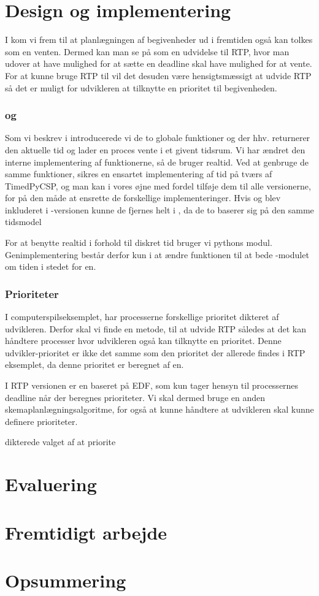 \section{Design og implementering} 
I \des kom vi frem til at planlægningen af begivenheder ud i fremtiden også kan tolkes som en venten. Dermed kan man se på \is som en udvidelse til RTP, hvor man udover at have mulighed for at sætte en deadline skal have mulighed for at vente. For at kunne bruge RTP til \is vil det desuden være hensigtsmæssigt at  udvide RTP så det er muligt for udvikleren at tilknytte en prioritet til begivenheden.

\subsubsection{ og }
Som vi beskrev i \des introducerede vi de to globale funktioner  og  der hhv. returnerer den aktuelle tid og lader en proces vente i et givent tidsrum. Vi har ændret den interne implementering af funktionerne, så de bruger realtid. Ved at genbruge de samme funktioner, sikres en ensartet implementering af tid på tværs af TimedPyCSP, og man kan i vores øjne med fordel tilføje dem til alle \pycsp versionerne, for på den måde at ensrette de forskellige implementeringer. Hvis  og  blev inkluderet i -versionen kunne de fjernes helt i \is, da de to baserer sig på den samme tidsmodel

 
For at benytte realtid i forhold til diskret tid bruger vi pythons  modul. Genimplementering består derfor kun i at ændre funktionen  til at bede -modulet om tiden i stedet for \sched en.

\subsubsection{Prioriteter}

I computerspilseksemplet, har processerne forskellige prioritet dikteret af udvikleren. Derfor skal vi finde en metode, til at udvide RTP således at det kan håndtere processer hvor udvikleren også kan tilknytte en prioritet. Denne udvikler-prioritet er ikke det samme som den prioritet der allerede findes i RTP eksemplet, da denne prioritet er beregnet af \sched en.

I RTP versionen er \sched en baseret på EDF, som kun tager hensyn til processernes deadline når der beregnes prioriteter. Vi skal dermed bruge en anden skemaplanlægningsalgoritme, for også at kunne håndtere at udvikleren skal kunne definere prioriteter.

 dikterede valget af \sched at priorite


    
\section{Evaluering}
\section{Fremtidigt arbejde}
\section{Opsummering}
